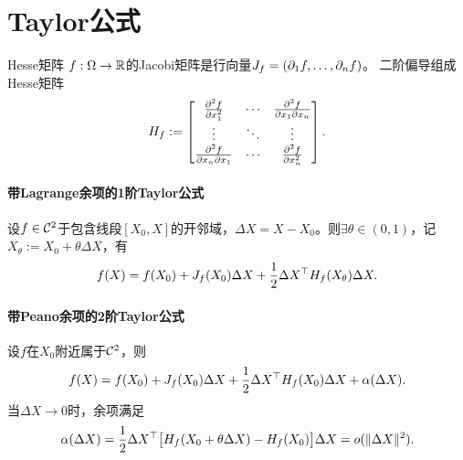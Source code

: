 \section{Taylor公式}
\begin{definition}{Hesse矩阵}{}
	$f:\Omega \to \mathbb{R}$的Jacobi矩阵是行向量$J_f = (\partial_1f,\ldots,\partial_nf)$。
	二阶偏导组成Hesse矩阵
	\begin{equation}\label{eq:calc-hessian}
		H_f :=
		\begin{bmatrix}
			\frac{\partial^2f}{\partial x_1^2}     & \cdots & \frac{\partial^2f}{\partial x_1\partial x_n} \\
			\vdots                     & \ddots & \vdots                     \\
			\frac{\partial^2f}{\partial x_n\partial x_1} & \cdots & \frac{\partial^2f}{\partial x_n^2}
		\end{bmatrix}.
	\end{equation}
\end{definition}
\paragraph{带Lagrange余项的1阶Taylor公式}
设$f \in \mathcal{C}^2$于包含线段$[X_0,X]$的开邻域，$\Delta X = X - X_0$。则$\exists\theta \in (0,1)$，记$X_\theta := X_0 + \theta\Delta X$，有
\begin{align}
	f(X) = f(X_0) + J_f(X_0)\Delta X + \frac12\Delta X^\top H_f(X_\theta)\Delta X.
\end{align}
\paragraph{带Peano余项的2阶Taylor公式}
设$f$在$X_0$附近属于$\mathcal{C}^2$，则
\begin{align}
	f(X) = f(X_0) + J_f(X_0)\Delta X + \frac12\Delta X^\top H_f(X_0)\Delta X + \alpha(\Delta X).
\end{align}
当$\Delta X \to 0$时，余项满足
\[
	\alpha(\Delta X) = \frac12\Delta X^\top
	\bigl[H_f(X_0 + \theta\Delta X) - H_f(X_0)\bigr]\Delta X = o(\lVert\Delta X\rVert^2).
\]

